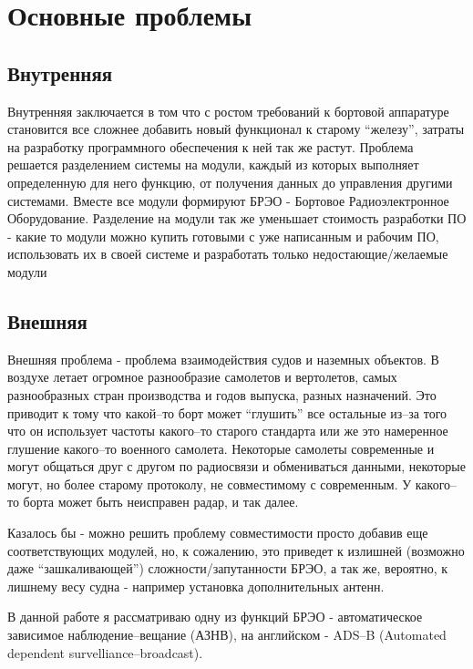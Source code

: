 \documentclass[a4paper,12pt]{report} %
\begin{document}
\section{Основные проблемы}

\subsection{Внутренняя}

Внутренняя заключается в том что с ростом требований к бортовой аппаратуре
становится все сложнее добавить новый функционал к старому ``железу'', затраты
на разработку программного обеспечения к ней так же растут. Проблема решается
разделением системы на модули, каждый из которых выполняет определенную для него
функцию, от получения данных до управления другими системами. Вместе все модули
формируют БРЭО - Бортовое Радиоэлектронное Оборудование. Разделение на модули
так же уменьшает стоимость разработки ПО - какие то модули можно купить готовыми
с уже написанным и рабочим ПО, использовать их в своей системе и разработать
только недостающие/желаемые модули

\subsection{Внешняя}

Внешняя проблема - проблема взаимодействия судов и наземных объектов. В воздухе
летает огромное разнообразие самолетов и вертолетов, самых разнообразных стран
производства и годов выпуска, разных назначений. Это приводит к тому что
какой--то борт может ``глушить'' все остальные из--за того что он использует
частоты какого--то старого стандарта или же это намеренное глушение какого--то
военного самолета. Некоторые самолеты современные и могут общаться друг с другом
по радиосвязи и обмениваться данными, некоторые могут, но более старому
протоколу, не совместимому с современным. У какого--то борта может быть
неисправен радар, и так далее.

Казалось бы - можно решить проблему совместимости просто добавив еще
соответствующих модулей, но, к сожалению, это приведет к излишней (возможно даже
``зашкаливающей'') сложности/запутанности БРЭО, а так же, вероятно, к лишнему
весу судна - например установка дополнительных антенн.

В данной работе я рассматриваю одну из функций БРЭО - автоматическое зависимое
наблюдение--вещание (АЗНВ), на английском - ADS--B (Automated dependent
survelliance--broadcast).
\end{document}
